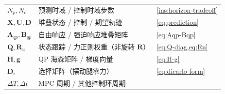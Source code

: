 \begin{table}[H]
\begin{tabular}{lll}
$N_p,N_c$ & 预测时域 / 控制时域步数 & \cref{ins:horizon-tradeoff} \\
$\mathbf{X},\mathbf{U},\mathbf{D}$ & 堆叠状态 / 控制 / 期望轨迹 & \cref{eq:prediction} \\
$\mathbf{A}_{qp},\mathbf{B}_{qp}$ & 自由响应 / 强迫响应堆叠矩阵 & \cref{eq:Aqp-Bqp} \\
$\mathbf{Q},\mathbf{R}_u$ & 状态跟踪 / 力正则权重（非旋转 $\mathbf{R}$） & \cref{eq:Q-diag,eq:Ru} \\
$\mathbf{H},\mathbf{g}$ & QP 海森矩阵 / 梯度向量 & \cref{eq:H-g} \\
$\mathbf{D}_i$ & 选择矩阵（摆动腿零力） & \cref{eq:dicarlo-form} \\
$\Delta T,\Delta t$ & MPC 周期 / 其他控制环周期 & \nameref{ch:notation} \\
\bottomrule
\end{tabular}
\end{table}


